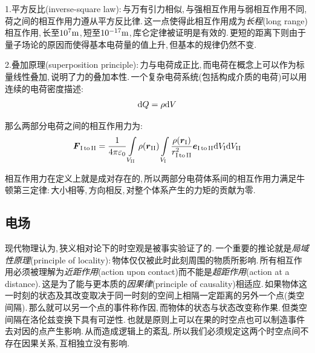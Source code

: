 1.{\hei 平方反比(inverse-square law)}:\,与万有引力相似,\,与强相互作用与弱相互作用不同,\,荷之间的相互作用力遵从平方反比律.\,这一点使得此相互作用成为\emph{长程}(long range)相互作用,\,长至\(10^7{\rm m}\),\,短至\(10^{-17}{\rm m}\),\,库仑定律被证明是有效的.\,更短的距离下则由于量子场论的原因而使得基本电荷量的值上升,\,但基本的规律仍然不变.

2.{\hei 叠加原理(superposition principle)}:\,力与电荷成正比,\,而电荷在概念上可以作为标量线性叠加,\,说明了力的叠加本性.\,一个复杂电荷系统(包括构成介质的电荷)可以用连续的电荷密度描述:
\[\textrm{d} Q=\rho \textrm{d} V\]
	
那么两部分电荷之间的相互作用力为:
\[\boldsymbol{F}_{\rm I\,to\,II}=\frac{1}{4\pi\varepsilon_0}\int\limits_{V_{\rm II}}\rho(\boldsymbol{r}_{\rm II})\int\limits_{V_{\rm I}}\frac{\rho(\boldsymbol{r}_{\rm I})}{r_{\rm I\,to\,II}^2}\boldsymbol{e}_{\rm I\,to\,II}\textrm{d} V_{\rm I}\textrm{d} V_{\rm II}\]

相互作用力在定义上就是成对存在的,\,所以两部分电荷体系间的相互作用力满足牛顿第三定律:\,大小相等,\,方向相反,\,对整个体系产生的力矩的贡献为零.

\vspace{1cm}
\subsection{电场}
现代物理认为,\,狭义相对论下的时空观是被事实验证了的.\,一个重要的推论就是\emph{局域性原理}(principle of locality):\,物体仅仅被此时此刻周围的物质所影响.\,所有相互作用必须被理解为\emph{近距作用}(action upon contact)而不能是\emph{超距作用}(action at a distance).\,这是为了能与更本质的\emph{因果律}(principle of causality)相适应.\,如果物体这一时刻的状态及其改变取决于同一时刻的空间上相隔一定距离的另外一个点(类空间隔).\,那么就可以另一个点的事件称作因,\,而物体的状态与状态改变称作果.\,但类空间隔在洛伦兹变换下具有可逆性.\,也就是原则上可以在果的时空点也可以制造事件去对因的点产生影响.\,从而造成逻辑上的紊乱.\,所以我们必须规定这两个时空点间不存在因果关系,\,互相独立没有影响.

